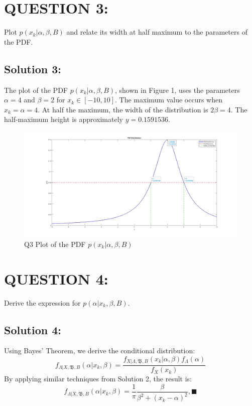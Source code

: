 \documentclass[a4paper,11pt]{article}
\begin{document}
\section{QUESTION 3:}
Plot $p(x_k | \alpha, \beta, B)$ and relate its width at half maximum to the parameters of the PDF.

\subsection*{Solution 3:} The plot of the PDF $ p(x_k | \alpha, \beta, B)$, shown in Figure 1, uses the parameters $\alpha = 4$ and $\beta = 2$ for $x_k \in [-10, 10]$. The maximum value occurs when $x_k = \alpha = 4$. At half the maximum, the width of the distribution is $2 \beta = 4$. The half-maximum height is approximately $y = 0.1591536$.

\begin{figure}[h] \centering \includegraphics[scale=0.16]{q03pdfplot.jpg} \caption{Q3 Plot of the PDF $p(x_k | \alpha, \beta, B)$} \end{figure}

\section{QUESTION 4:}
Derive the expression for $p(\alpha | x_k, \beta, B)$.

\subsection*{Solution 4:} Using Bayes' Theorem, we derive the conditional distribution: \begin{equation} f_{\Lambda | X, \mathfrak{B},B} (\alpha | x_k, \beta) = \frac{f_{X | \Lambda, \mathfrak{B}, B}(x_k | \alpha, \beta) f_\Lambda(\alpha)}{f_X(x_k)} \end{equation} By applying similar techniques from Solution 2, the result is: \begin{equation} f_{\Lambda | X, \mathfrak{B}, B}(\alpha | x_k, \beta) = \frac{1}{\pi} \frac{\beta}{\beta^2 + (x_k - \alpha)^2} , \blacksquare \end{equation}
\end{document}
